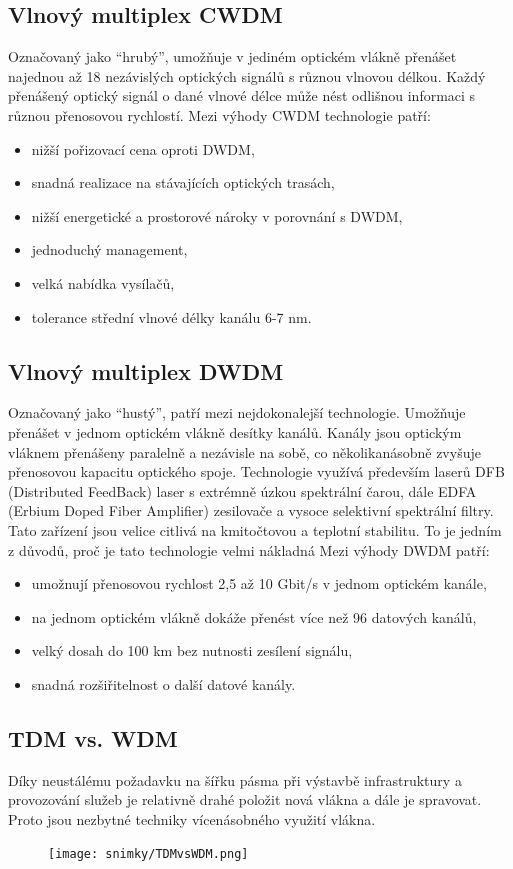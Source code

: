 \subsection{Vlnový multiplex CWDM }
Označovaný jako \enquote{hrubý}, umožňuje v jediném optickém vlákně přenášet najednou až 18 nezávislých optických signálů s různou vlnovou délkou. Každý přenášený optický signál o dané vlnové délce může nést odlišnou informaci s různou přenosovou rychlostí.
Mezi výhody CWDM technologie patří:
\begin{itemize}
    \item nižší pořizovací cena oproti DWDM,
    \item snadná realizace na stávajících optických trasách,
    \item nižší energetické a prostorové nároky v porovnání s DWDM,
    \item jednoduchý management,
    \item velká nabídka vysílačů,
    \item tolerance střední vlnové délky kanálu 6-7 nm.
\end{itemize}

\subsection{Vlnový multiplex DWDM}
Označovaný jako \enquote{hustý}, patří mezi nejdokonalejší technologie. Umožňuje přenášet v jednom optickém vlákně desítky kanálů. Kanály jsou optickým vláknem přenášeny paralelně a nezávisle na sobě, co několikanásobně zvyšuje přenosovou kapacitu optického spoje. Technologie využívá především laserů DFB (Distributed FeedBack) laser s extrémně úzkou spektrální čarou, dále EDFA (Erbium Doped Fiber Amplifier) zesilovače a vysoce selektivní
spektrální filtry. Tato zařízení jsou velice citlivá na kmitočtovou a teplotní stabilitu. To je jedním z důvodů, proč je tato technologie velmi nákladná
Mezi výhody DWDM patří:
\begin{itemize}
    \item umožnují přenosovou rychlost 2,5 až 10 Gbit/s v jednom optickém kanále,
    \item na jednom optickém vlákně dokáže přenést více než 96 datových kanálů,
    \item velký dosah do 100 km bez nutnosti zesílení signálu,
    \item snadná rozšiřitelnost o další datové kanály.
\end{itemize}

\subsection{TDM vs. WDM}
Díky neustálému požadavku na šířku pásma při výstavbě infrastruktury a provozování služeb je relativně drahé položit nová vlákna a dále je
spravovat. Proto jsou nezbytné techniky vícenásobného využití vlákna.
\begin{figure} [h]
    \centering
    \texttt{[image: snimky/TDMvsWDM.png]}
    \label{fig:tdm-wdm}
\end{figure}

